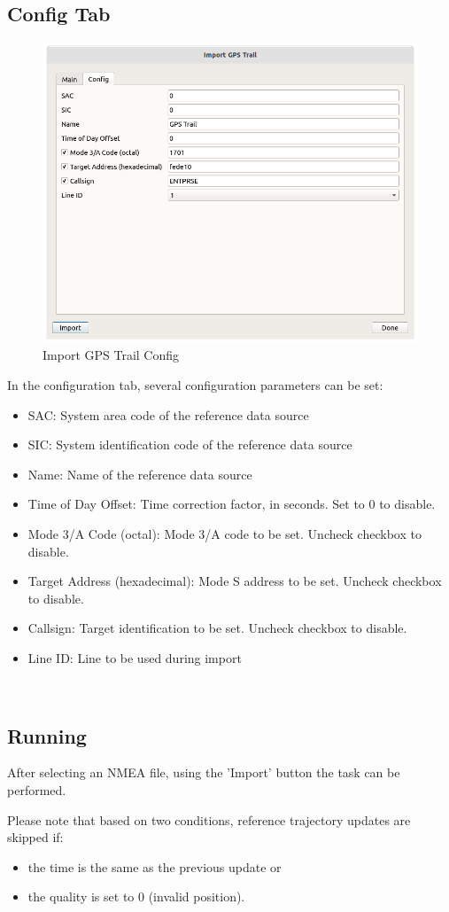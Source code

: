 \subsection{Config Tab}

\begin{figure}[H]
    \includegraphics[width=16cm]{figures/gps_import_config.png}
  \caption{Import GPS Trail Config}
\end{figure}

In the configuration tab, several configuration parameters can be set:

\begin{itemize}
\item SAC: System area code of the reference data source
\item SIC: System identification code of the reference data source
\item Name: Name of the reference data source
\item Time of Day Offset: Time correction factor, in seconds. Set to 0 to disable.
\item Mode 3/A Code (octal): Mode 3/A code to be set. Uncheck checkbox to disable.
\item Target Address (hexadecimal): Mode S address to be set. Uncheck checkbox to disable.
\item Callsign: Target identification to be set. Uncheck checkbox to disable.
\item Line ID: Line to be used during import
\end{itemize}
\ \\

\subsection{Running}

After selecting an NMEA file, using the 'Import' button the task can be performed.

Please note that based on two conditions, reference trajectory updates are skipped if:
\begin{itemize}
\item the time is the same as the previous update or
\item the quality is set to 0 (invalid position).
\end{itemize}

